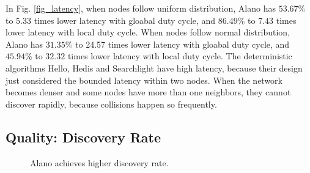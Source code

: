 In Fig. \ref{fig_latency}, when nodes follow uniform distribution, Alano has $53.67\%$ to $5.33$ times lower latency with gloabal duty cycle, and $86.49\%$ to $7.43$ times lower latency with local duty cycle. 
When nodes follow normal distribution, Alano has $31.35\%$ to 24.57 times lower latency with gloabal duty cycle, and $45.94\%$ to $32.32$ times lower latency with local duty cycle. 
The deterministic algorithms Hello, Hedis and Searchlight have high latency, because their design just considered the bounded latency within two nodes. When the network becomes denser and some nodes have more than one neighbors, they cannot discover rapidly, because collisions happen so frequently.


\subsection{Quality: Discovery Rate}

\begin{figure}[!t]

\hspace{0.01in}
\hspace{0.01in}
\hspace{0.01in}
\caption{Alano achieves higher discovery rate.}
\label{fig_timerate}
\end{figure}


